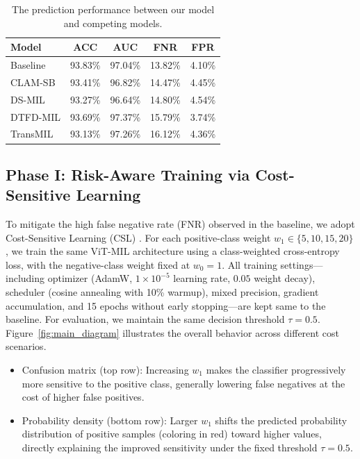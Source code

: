 \documentclass[sigconf,review,anonymous]{acmart}
\theoremstyle{remark}
\begin{document}
\begin{table}[htbp]
  \centering
  \caption{The prediction performance between our model and competing models.}
  \label{tab:architecture_comparison}
  \begin{tabular}{lcccc}
    \toprule
    Model & ACC & AUC & FNR & FPR \\
    \midrule
    Baseline  & 93.83\% & 97.04\% & 13.82\% & 4.10\% \\
    CLAM-SB   & 93.41\% & 96.82\% & 14.47\% & 4.45\% \\
    DS-MIL    & 93.27\% & 96.64\% & 14.80\% & 4.54\% \\
    DTFD-MIL  & 93.69\% & 97.37\% & 15.79\% & 3.74\% \\
    TransMIL  & 93.13\% & 97.26\% & 16.12\% & 4.36\% \\
    \bottomrule
  \end{tabular}
\end{table}




\subsection{Phase I: Risk-Aware Training via Cost-Sensitive Learning}
\label{sec:phase1_results}

To mitigate the high false negative rate (FNR) observed in the baseline, we adopt Cost-Sensitive Learning (CSL) \cite{el2010foundations,zadrozny2004learning}. For each positive-class weight $w_{1} \in \{5,10,15,20\}$, we train the same ViT-MIL architecture using a class-weighted cross-entropy loss, with the negative-class weight fixed at $w_{0}=1$. All training settings—including optimizer (AdamW, $1\times10^{-5}$ learning rate, $0.05$ weight decay), scheduler (cosine annealing with 10\% warmup), mixed precision, gradient accumulation, and 15 epochs without early stopping—are kept same to the baseline. For evaluation, we maintain the same decision threshold $\tau = 0.5$. Figure~\ref{fig:main_diagram} illustrates the overall behavior across different cost scenarios.

\begin{itemize}
    \item Confusion matrix (top row): Increasing $w_1$ makes the classifier progressively more sensitive to the positive class, generally lowering false negatives at the cost of higher false positives.
    \item Probability density (bottom row): Larger $w_1$ shifts the predicted probability distribution of positive samples (coloring in red) toward higher values, directly explaining the improved sensitivity under the fixed threshold $\tau=0.5$.
\end{itemize}
\end{document}
